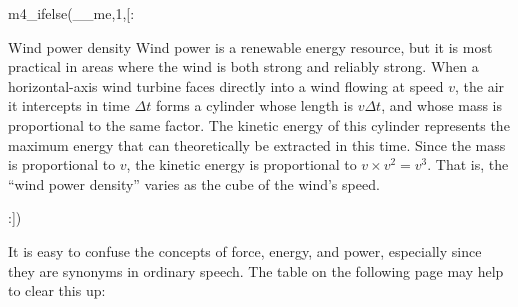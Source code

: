 m4_ifelse(__me,1,[:\begin{eg}{Wind power density}\label{eg:wind-power-density}
Wind power is a renewable energy resource, but it is most practical in areas where the
wind is both strong and reliably strong. When a horizontal-axis wind turbine faces
directly into a wind flowing at speed $v$, the air it intercepts in time $\Delta t$
forms a cylinder whose length is $v\Delta t$, and whose mass is proportional to the same
factor. The kinetic energy of this cylinder represents the maximum energy that can theoretically
be extracted in this time. Since the mass is proportional to $v$, the kinetic energy is proportional
to $v\times v^2=v^3$. That is, the ``wind power density'' varies as the cube of the wind's speed.
\end{eg}:])

It is easy to confuse the concepts of force, energy, and
power, especially since they are synonyms in ordinary
speech. The table on the following page may help to clear this up:

\vfill

